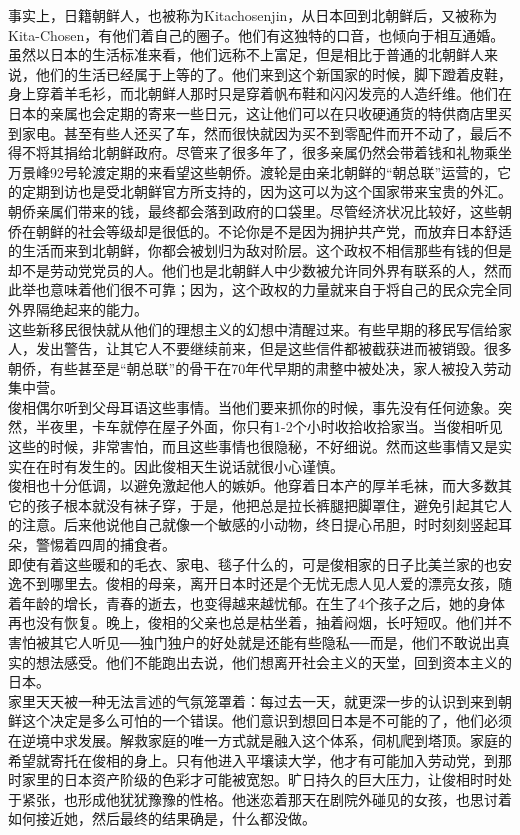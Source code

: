 事实上，日籍朝鲜人，也被称为Kitachosenjin，从日本回到北朝鲜后，又被称为Kita-Chosen，有他们着自己的圈子。他们有这独特的口音，也倾向于相互通婚。虽然以日本的生活标准来看，他们远称不上富足，但是相比于普通的北朝鲜人来说，他们的生活已经属于上等的了。他们来到这个新国家的时候，脚下蹬着皮鞋，身上穿着羊毛衫，而北朝鲜人那时只是穿着帆布鞋和闪闪发亮的人造纤维。他们在日本的亲属也会定期的寄来一些日元，这让他们可以在只收硬通货的特供商店里买到家电。甚至有些人还买了车，然而很快就因为买不到零配件而开不动了，最后不得不将其捐给北朝鲜政府。尽管来了很多年了，很多亲属仍然会带着钱和礼物乘坐万景峰92号轮渡定期的来看望这些朝侨。渡轮是由亲北朝鲜的“朝总联”运营的，它的定期到访也是受北朝鲜官方所支持的，因为这可以为这个国家带来宝贵的外汇。朝侨亲属们带来的钱，最终都会落到政府的口袋里。尽管经济状况比较好，这些朝侨在朝鲜的社会等级却是很低的。不论你是不是因为拥护共产党，而放弃日本舒适的生活而来到北朝鲜，你都会被划归为敌对阶层。这个政权不相信那些有钱的但是却不是劳动党党员的人。他们也是北朝鲜人中少数被允许同外界有联系的人，然而此举也意味着他们很不可靠；因为，这个政权的力量就来自于将自己的民众完全同外界隔绝起来的能力。\\

这些新移民很快就从他们的理想主义的幻想中清醒过来。有些早期的移民写信给家人，发出警告，让其它人不要继续前来，但是这些信件都被截获进而被销毁。很多朝侨，有些甚至是“朝总联”的骨干在70年代早期的肃整中被处决，家人被投入劳动集中营。\\

俊相偶尔听到父母耳语这些事情。当他们要来抓你的时候，事先没有任何迹象。突然，半夜里，卡车就停在屋子外面，你只有1-2个小时收拾收拾家当。当俊相听见这些的时候，非常害怕，而且这些事情也很隐秘，不好细说。然而这些事情又是实实在在时有发生的。因此俊相天生说话就很小心谨慎。\\

俊相也十分低调，以避免激起他人的嫉妒。他穿着日本产的厚羊毛袜，而大多数其它的孩子根本就没有袜子穿，于是，他把总是拉长裤腿把脚罩住，避免引起其它人的注意。后来他说他自己就像一个敏感的小动物，终日提心吊胆，时时刻刻竖起耳朵，警惕着四周的捕食者。\\

即使有着这些暖和的毛衣、家电、毯子什么的，可是俊相家的日子比美兰家的也安逸不到哪里去。俊相的母亲，离开日本时还是个无忧无虑人见人爱的漂亮女孩，随着年龄的增长，青春的逝去，也变得越来越忧郁。在生了4个孩子之后，她的身体再也没有恢复。晚上，俊相的父亲也总是枯坐着，抽着闷烟，长吁短叹。他们并不害怕被其它人听见──独门独户的好处就是还能有些隐私──而是，他们不敢说出真实的想法感受。他们不能跑出去说，他们想离开社会主义的天堂，回到资本主义的日本。\\

家里天天被一种无法言述的气氛笼罩着：每过去一天，就更深一步的认识到来到朝鲜这个决定是多么可怕的一个错误。他们意识到想回日本是不可能的了，他们必须在逆境中求发展。解救家庭的唯一方式就是融入这个体系，伺机爬到塔顶。家庭的希望就寄托在俊相的身上。只有他进入平壤读大学，他才有可能加入劳动党，到那时家里的日本资产阶级的色彩才可能被宽恕。旷日持久的巨大压力，让俊相时时处于紧张，也形成他犹犹豫豫的性格。他迷恋着那天在剧院外碰见的女孩，也思讨着如何接近她，然后最终的结果确是，什么都没做。\\
